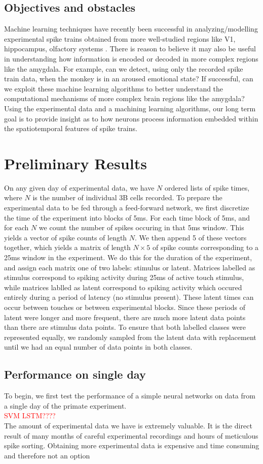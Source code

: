 \documentclass[12pt]{article}
\begin{document}
\subsection{Objectives and obstacles}
Machine learning techniques have recently been successful in analyzing/modelling experimental spike trains obtained from more well-studied regions like V1, hippocampus, olfactory systems \cite{laza} \cite{banino} \cite{stevens}. There is reason to believe it may also be useful in understanding how information is encoded or decoded in more complex regions like the amygdala. For example, can we detect, using only the recorded spike train data, when the monkey is in an aroused emotional state? If successful, can we exploit these machine learning algorithms to better understand the computational mechanisms of more complex brain regions like the amygdala?  Using the
experimental data and a machining learning algorithms, our long term goal is to provide insight
as to how neurons process information embedded within the spatiotemporal features
of spike trains.
\section{Preliminary Results}
On any given day of experimental data, we have $N$ ordered lists of spike times, where $N$ is the number of individual 3B cells recorded. To prepare the experimental data to be fed through a feed-forward network, we first discretize the time of the experiment into blocks of 5ms. For each time block of 5ms, and for each $N$ we count the number of spikes occuring in that 5ms window. This yields a vector of spike counts of length $N$. We then append 5 of these vectors together, which yields a matrix of length $N\times5$ of spike counts corresponding to a 25ms window in the experiment. We do this for the duration of the experiment, and assign each matrix one of two labels: stimulus or latent. Matrices labelled as stimulus correspond to spiking activity during 25ms of active touch stimulus, while matrices lablled as latent correspond to spiking activity which occured entirely during a period of latency (no stimulus present). These latent times can occur between touches or between experimental blocks. Since these periods of latent were longer and more frequent, there are much more latent data points than there are stimulus data points. To ensure that both labelled classes were represented equally, we randomly sampled from the latent data with replacement until we had an equal number of data points in both classes.
\subsection{Performance on single day}
To begin, we first test the performance of a simple neural networks on data from a single day of the primate experiment.\\
\textcolor{red}{SVM}
\textcolor{red}{LSTM????}\\
The amount of experimental data we have is extremely valuable. It is the direct result of many months of careful experimental recordings and hours of meticulous spike sorting. Obtaining more experimental data is expensive and time consuming and therefore not an option
\end{document}
